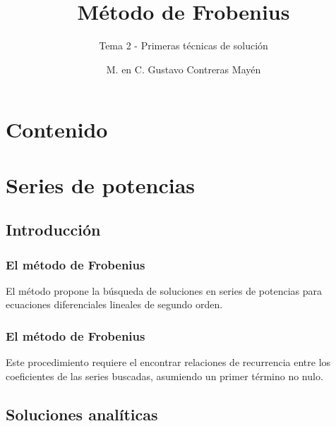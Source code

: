 \documentclass[12pt]{beamer}
\date{}
\title{\large{Método de Frobenius}}
\subtitle{Tema 2 - Primeras técnicas de solución}
\author{M. en C. Gustavo Contreras Mayén}
\begin{document}
\maketitle
\fontsize{14}{14}\selectfont
{}

\section*{Contenido}


\section{Series de potencias}
\subsection{Introducción}

\begin{frame}
\frametitle{El método de Frobenius}
El método propone la búsqueda de soluciones en series de potencias para ecuaciones diferenciales lineales de segundo orden.
\end{frame}
\begin{frame}
\frametitle{El método de Frobenius}
Este procedimiento requiere el encontrar relaciones de recurrencia entre los coeficientes de las series buscadas, asumiendo un primer término no nulo.
\end{frame}

\subsection{Soluciones analíticas}
\end{document}
